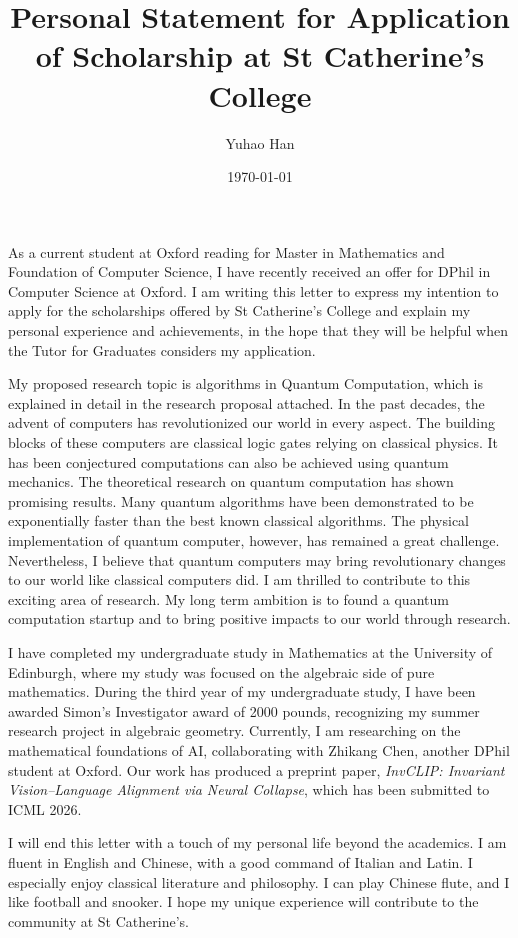 \documentclass{article}
\title{Personal Statement for Application of Scholarship at St Catherine's College}
\author{Yuhao Han}
\date{\today}
\theoremstyle{definition}
\theoremstyle{definition}
\theoremstyle{remark}
\begin{document}
\maketitle
   As a current student at Oxford reading for Master in Mathematics and Foundation of Computer Science, I have recently received an offer for DPhil in Computer Science at Oxford. 
   I am writing this letter to express my intention to apply for the scholarships offered by St Catherine's College and explain my personal experience and achievements, in the hope that they will be helpful when the Tutor for Graduates considers my application. 

   My proposed research topic is algorithms in Quantum Computation, which is explained in detail in the research proposal attached. 
   In the past decades, the advent of computers has revolutionized our world in every aspect. 
   The building blocks of these computers are classical logic gates relying on classical physics. 
   It has been conjectured computations can also be achieved using quantum mechanics. The theoretical research on quantum computation has shown promising results. 
   Many quantum algorithms have been demonstrated to be exponentially faster than the best known classical algorithms.
   The physical implementation of quantum computer, however, has remained a great challenge. 
   Nevertheless, I believe that quantum computers may bring revolutionary changes to our world like classical computers did. 
   I am thrilled to contribute to this exciting area of research. 
   My long term ambition is to found a quantum computation startup and to bring positive impacts to our world through research.
   
   I have completed my undergraduate study in Mathematics at the University of Edinburgh, where my study was focused on the algebraic side of pure mathematics.
   During the third year of my undergraduate study, I have been awarded Simon's Investigator award of 2000 pounds, recognizing my summer research project in algebraic geometry. 
   Currently, I am researching on the mathematical foundations of AI, collaborating with Zhikang Chen, another DPhil student at Oxford. 
   Our work has produced a preprint paper, \textit{InvCLIP: Invariant Vision–Language Alignment via Neural Collapse}, which has been submitted to ICML 2026. 

   I will end this letter with a touch of my personal life beyond the academics. 
   I am fluent in English and Chinese, with a good command of Italian and Latin. 
   I especially enjoy classical literature and philosophy. 
   I can play Chinese flute, and I like football and snooker. 
   I hope my unique experience will contribute to the community at St Catherine's.
\end{document}
